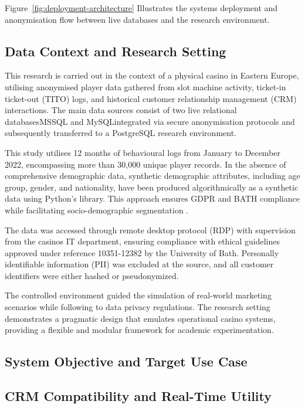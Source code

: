 \documentclass[12pt,a4paper]{report}
\begin{document}
Figure~\ref{fig:deployment-architecture} Illustrates the systems deployment and anonymisation flow between live databases and the research environment.


\subsection{Data Context and Research Setting}

This research is carried out in the context of a physical casino in Eastern Europe, utilising anonymised player data gathered from slot machine activity, ticket-in ticket-out (TITO) logs, and historical customer relationship management (CRM) interactions.  The main data sources consist of two live relational databasesMSSQL and MySQLintegrated via secure anonymisation protocols and subsequently transferred to a PostgreSQL research environment. 

 This study utilises 12 months of behavioural logs from January to December 2022, encompassing more than 30,000 unique player records.  In the absence of comprehensive demographic data, synthetic demographic attributes, including age group, gender, and nationality, have been produced algorithmically as a synthetic data using Python's library. This approach ensures GDPR and BATH compliance while facilitating socio-demographic segmentation \citep{gdpr2016}.

 The data was accessed through remote desktop protocol (RDP) with supervision from the casinos IT department, ensuring compliance with ethical guidelines approved under reference 10351-12382 by the University of Bath.  Personally identifiable information (PII) was excluded at the source, and all customer identifiers were either hashed or pseudonymized.

 The controlled environment guided the simulation of real-world marketing scenarios while following to data privacy regulations.  The research setting demonstrates a pragmatic design that emulates operational casino systems, providing a flexible and modular framework for academic experimentation.


\subsection{System Objective and Target Use Case}


\subsection{CRM Compatibility and Real-Time Utility}
\end{document}
